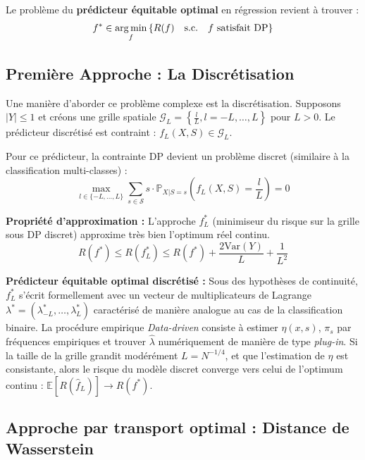 Le problème du \textbf{prédicteur équitable optimal} en régression revient à trouver :
\begin{equation}
    f^* \in \operatorname*{arg\,min}_{f} \left\{ R(f) \quad \text{s.c.} \quad f \text{ satisfait DP} \right\}
\end{equation}

\subsection{Première Approche : La Discrétisation}
Une manière d'aborder ce problème complexe est la discrétisation. Supposons $|Y| \le 1$ et créons une grille spatiale $\mathcal{G}_L = \left\{ \frac{l}{L}, l = -L, \dots, L \right\}$ pour $L > 0$.
Le prédicteur discrétisé est contraint : $f_L(X,S) \in \mathcal{G}_L$.

Pour ce prédicteur, la contrainte DP devient un problème discret (similaire à la classification multi-classes) : 
\begin{equation}
    \max_{l \in \{-L, \dots, L\}} \sum_{s \in \mathcal{S}} s \cdot \mathbb{P}_{X|S=s} \left(f_L(X, S) = \frac{l}{L}\right) = 0
\end{equation}

\textbf{Propriété d'approximation :} L'approche $f_L^*$ (minimiseur du risque sur la grille sous DP discret) approxime très bien l'optimum réel continu.
\begin{equation}
    R(f^*) \le R(f_L^*) \le R(f^*) + \frac{2 \text{Var}(Y)}{L} + \frac{1}{L^2}
\end{equation}

\textbf{Prédicteur équitable optimal discrétisé :} 
Sous des hypothèses de continuité, $f_L^*$ s'écrit formellement avec un vecteur de multiplicateurs de Lagrange $\lambda^* = (\lambda_{-L}^*, \dots, \lambda_L^*)$ caractérisé de manière analogue au cas de la classification binaire.
La procédure empirique \textit{Data-driven} consiste à estimer $\eta(x,s)$, $\pi_s$ par fréquences empiriques et trouver $\hat{\lambda}$ numériquement de manière de type \textit{plug-in}.
Si la taille de la grille grandit modérément $L = N^{-1/4}$, et que l'estimation de $\eta$ est consistante, alors le risque du modèle discret converge vers celui de l'optimum continu : $\mathbb{E}[R(\hat{f}_L)] \to R(f^*)$.

\subsection{Approche par transport optimal : Distance de Wasserstein}

